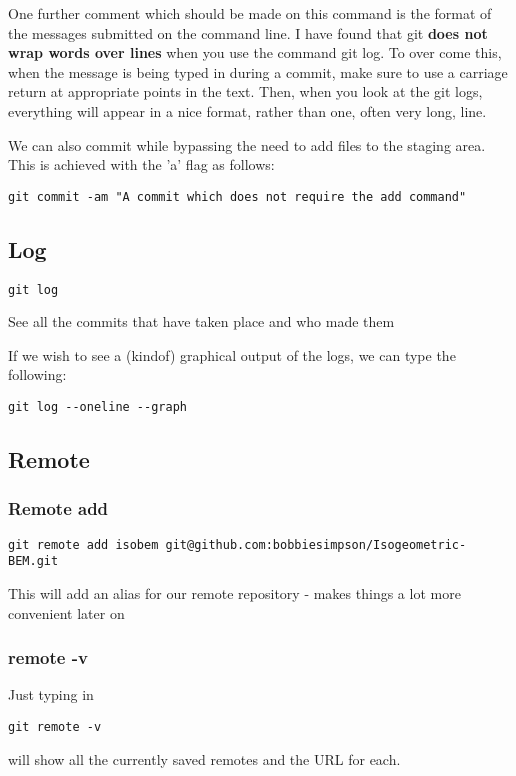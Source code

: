 \documentclass[a4paper, 10pt]{article}
\begin{document}
One further comment which should be made on this command is the format of the messages submitted on the command line. I have found that git {\bf does not wrap words over lines} when you use the command git log. To over come this, when the message is being typed in during a commit, make sure to use a carriage return at appropriate points in the text. Then, when you look at the git logs, everything will appear in a nice format, rather than one, often very long, line.

We can also commit while bypassing the need to add files to the
staging area. This is achieved with the 'a' flag as follows:
\begin{verbatim}
git commit -am "A commit which does not require the add command"
\end{verbatim}

\subsection*{Log}
\begin{Verbatim}
git log
\end{Verbatim}
See all the commits that have taken place and who made them

If we wish to see a (kindof) graphical output of the logs, we can type
the following:
\begin{verbatim}
git log --oneline --graph
\end{verbatim}

\subsection*{Remote}

\subsubsection*{Remote add}

\begin{Verbatim}
git remote add isobem git@github.com:bobbiesimpson/Isogeometric-BEM.git
\end{Verbatim}
This will add an alias for our remote repository - makes things a lot more convenient later on

\subsubsection*{remote -v}
\label{sec:remote-v}

Just typing in 
\begin{verbatim}
git remote -v
\end{verbatim}
will show all the currently saved remotes and the URL for each.
\end{document}

